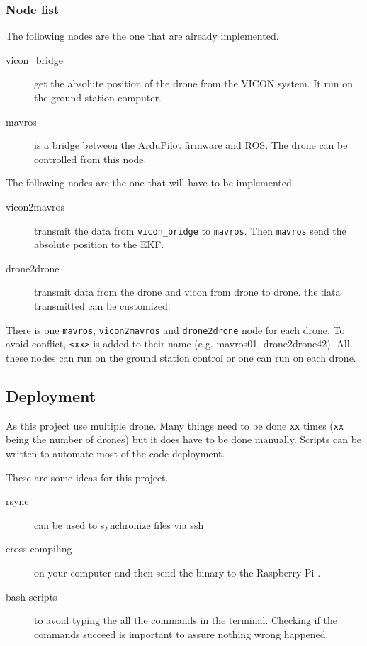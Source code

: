 \subsubsection{Node list}

The following nodes are the one that are already implemented.

\begin{description}
    \item[vicon\_bridge] get the absolute position of the drone from the VICON system.
          It run on the ground station computer.
    \item[mavros] is a bridge between the ArduPilot firmware and ROS.
          The drone can be controlled from this node.
\end{description}

The following nodes are the one that will have to be implemented

\begin{description}
    \item[vicon2mavros] transmit the data from \texttt{vicon\_bridge} to \texttt{mavros}.
          Then \texttt{mavros} send the absolute position to the EKF.
    \item[drone2drone] transmit data from the drone and vicon from drone to drone.
          the data transmitted can be customized.
\end{description}

There is one \texttt{mavros}, \texttt{vicon2mavros} and \texttt{drone2drone}
node for each drone. To avoid conflict, \texttt{<xx>} is added to their name (e.g. mavros01, drone2drone42).
All these nodes can run on the ground station control or one can run on each drone.

\subsection{Deployment}
As this project use multiple drone. Many things need to be done \texttt{xx} times (\texttt{xx} being the number of drones) but it does have to be done manually.
Scripts can be written to automate most of the code deployment.

These are some ideas for this project.
\begin{description}
  \item[rsync] can be used to synchronize files via ssh
  \item[cross-compiling] on your computer and then send the binary to the Raspberry Pi \cite{hackaday_cross_compiling}.
  \item[bash scripts] to avoid typing the all the commands in the terminal. Checking if the commands succeed is important to assure nothing wrong happened. \cite{ryanstutorials_bash_scripting}
\end{description}

